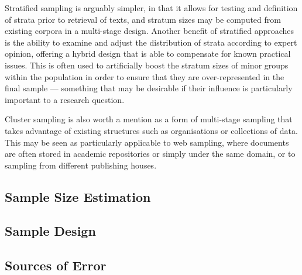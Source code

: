 Stratified sampling is arguably simpler, in that it allows for testing and definition of strata prior to retrieval of texts, and stratum sizes may be computed from existing corpora in a multi-stage design.  Another benefit of stratified approaches is the ability to examine and adjust the distribution of strata according to expert opinion, offering a hybrid design that is able to compensate for known practical issues.  This is often used to artificially boost the stratum sizes of minor groups within the population in order to ensure that they are over-represented in the final sample --- something that may be desirable if their influence is particularly important to a research question.

Cluster sampling is also worth a mention as a form of multi-stage sampling that takes advantage of existing structures such as organisations or collections of data.  This may be seen as particularly applicable to web sampling, where documents are often stored in academic repositories or simply under the same domain, or to sampling from different publishing houses.



\subsection{Sample Size Estimation}

\subsection{Sample Design}

\subsection{Sources of Error}












